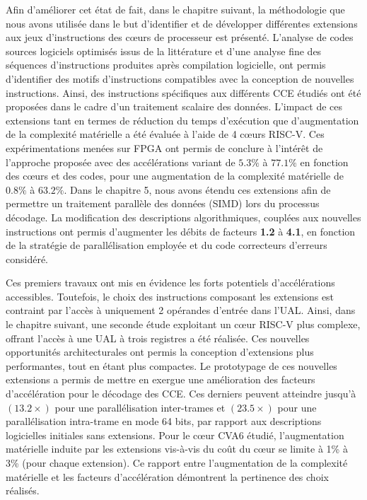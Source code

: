 \documentclass[../main.tex]{subfiles}
\begin{document}
Afin d’améliorer cet état de fait, dans le chapitre suivant, la méthodologie que nous avons utilisée dans le but d'identifier et de développer différentes extensions aux jeux d’instructions des cœurs de processeur est présenté. 
L’analyse de codes sources logiciels optimisés issus de la littérature et d’une analyse fine des séquences d'instructions produites après compilation logicielle, ont permis d’identifier des motifs d’instructions compatibles avec la conception de nouvelles instructions. 
Ainsi, des instructions spécifiques aux différents CCE étudiés ont été proposées dans le cadre d’un traitement scalaire des données. 
L’impact de ces extensions tant en termes de réduction du temps d’exécution que d’augmentation de la complexité matérielle a été évaluée à l’aide de 4 cœurs RISC-V. 
Ces expérimentations menées sur FPGA ont permis de conclure à l’intérêt de l’approche proposée avec des accélérations variant de $5.3\%$ à $77.1\%$ en fonction des cœurs et des codes, pour une augmentation de la complexité matérielle de $0.8\%$ à $63.2\%$. 
Dans le chapitre 5, nous avons étendu ces extensions afin de permettre un traitement parallèle des données (SIMD) lors du processus décodage. 
La modification des descriptions algorithmiques, couplées aux nouvelles instructions ont permis d’augmenter les débits de facteurs \textbf{1.2\times} à \textbf{4.1\times}, en fonction de la stratégie de parallélisation employée et du code correcteurs d’erreurs considéré.

Ces premiers travaux ont mis en évidence les forts potentiels d’accélérations accessibles. 
Toutefois, le choix des instructions composant les extensions est contraint par l’accès à uniquement 2 opérandes d’entrée dans l’UAL.
Ainsi, dans le chapitre suivant, une seconde étude exploitant un cœur RISC-V plus complexe, offrant l’accès à une UAL à trois registres a été réalisée.
Ces nouvelles opportunités architecturales ont permis la conception d’extensions plus performantes, tout en étant plus compactes.
Le prototypage de ces nouvelles extensions a permis de mettre en exergue une amélioration des facteurs d’accélération pour le décodage des CCE. 
Ces derniers peuvent atteindre jusqu’à $(13.2\times)$ pour une parallélisation inter-trames et $(23.5\times)$ pour une parallélisation intra-trame en mode 64 bits, par rapport aux descriptions logicielles initiales sans extensions.
Pour le cœur CVA6 étudié, l’augmentation matérielle induite par les extensions vis-à-vis du coût du cœur se limite à 1\% à 3\% (pour chaque extension).
Ce rapport entre l’augmentation de la complexité matérielle et les facteurs d’accélération démontrent la pertinence des choix réalisés.
\end{document}

